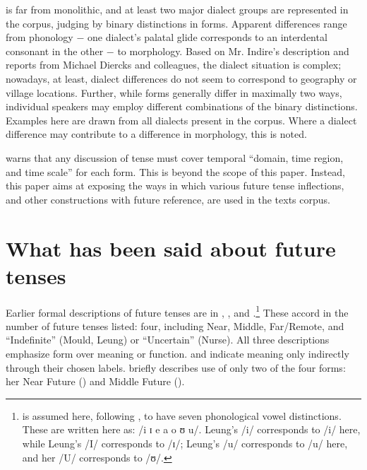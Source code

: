 \documentclass[output=paper]{langsci/langscibook}
\begin{document}
 is far from monolithic, and at least two major dialect groups are represented in the corpus, judging by binary distinctions in forms. Apparent differences range from phonology $-$ one dialect’s palatal glide corresponds to an interdental consonant in the other $-$ to morphology. Based on Mr. Indire’s description and reports from Michael Diercks and colleagues, the dialect situation is complex; nowadays, at least, dialect differences do not seem to correspond to geography or village locations. Further, while forms generally differ in maximally two ways, individual speakers may employ different combinations of the binary distinctions. Examples here are drawn from all  dialects present in the corpus. Where a dialect difference may contribute to a difference in morphology, this is noted.

\citet[12]{Botne2013} warns that any discussion of  tense must cover temporal “domain, time region, and time scale” for each form. This is beyond the scope of this paper. Instead, this paper aims at exposing the ways in which various future tense inflections, and other constructions with future reference, are used in the texts corpus.

\section{What has been said about  future tenses} \label{sec:sarvasy:2}

Earlier formal descriptions of  future tenses are in \citet[206]{Mould1981}, \citet[174--189, 204--207, 273--284, 285--322]{Leung1991}, and \citet[100]{Nurse2003aspect}.\footnote{ is assumed here, following \citet{Leung1991}, to have seven phonological vowel distinctions. These are written here as: /i ɪ e a o ʊ u/. Leung’s /i/ corresponds to /i/ here, while Leung’s /I/ corresponds to /ɪ/; Leung’s /u/ corresponds to /u/ here, and her /U/ corresponds to /ʊ/.} These accord in the number of future tenses listed: four, including Near, Middle, Far/Remote, and ``Indefinite'' %
%
%
%
%
(Mould, Leung) or “Uncertain” (Nurse). All three descriptions emphasize form over meaning or function. \citet{Mould1981} and \citet{Nurse2003aspect} indicate meaning only indirectly through their chosen labels. \citet{Leung1991} briefly describes use of only two of the four forms: her Near Future (\citeyear[174]{Leung1991}) and Middle Future (\citeyear[285]{Leung1991}). 
\end{document}
